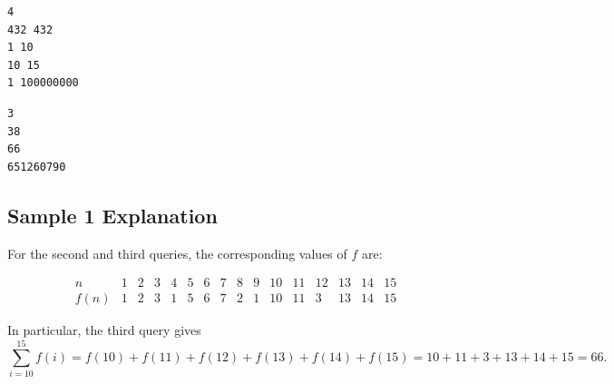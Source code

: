\begin{minipage}{\linewidth}
	\begin{minipage}[t]{0.49\linewidth}
		\begin{lstlisting}[title=\texttt{standard input}]
4
432 432
1 10
10 15
1 100000000
\end{lstlisting}
	\end{minipage}
	\begin{minipage}[t]{0.49\linewidth}
		\begin{lstlisting}[title=\texttt{standard output}]
3
38
66
651260790
\end{lstlisting}
	\end{minipage}
\end{minipage}


\subsection{Sample 1 Explanation}

For the second and third queries, the corresponding values of $f$ are:

\[
\begin{array}{c|ccccccccccccccc}
n
&1&2&3&4&5&6&7&8&9&10&11&12&13&14&15\\
\hline
f(n)
&1&2&3&1&5&6&7&2&1&10&11&3&13&14&15
\end{array}
\]

In particular, the third query gives
\[
	\sum_{i = 10}^{15}f(i) = f(10) + f(11) + f(12) + f(13) + f(14) + f(15) = 10 + 11 + 3 + 13 + 14 + 15 = 66.
\]



